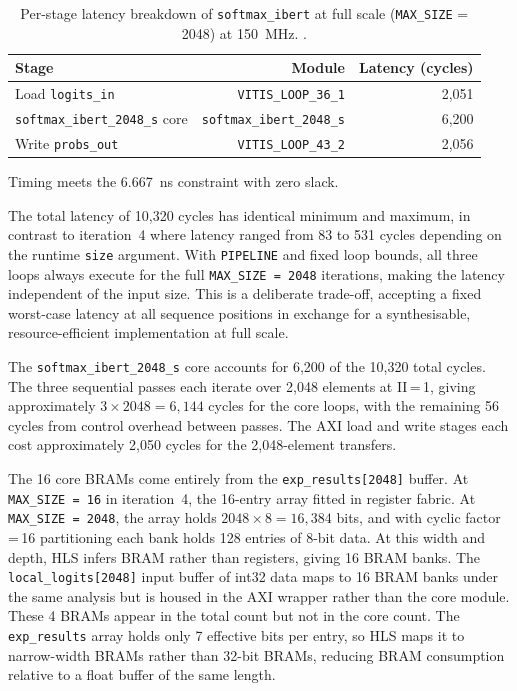 \begin{table}[H]
  \centering
  \begin{tabular}{lrr}
    \toprule
    Stage & Module & Latency (cycles) \\
    \midrule
    Load \texttt{logits\_in}                & \texttt{VITIS\_LOOP\_36\_1}      & 2{,}051 \\
    \texttt{softmax\_ibert\_2048\_s} core   & \texttt{softmax\_ibert\_2048\_s} & 6{,}200 \\
    Write \texttt{probs\_out}               & \texttt{VITIS\_LOOP\_43\_2}      & 2{,}056 \\
    \bottomrule
  \end{tabular}
  \caption{Per-stage latency breakdown of \texttt{softmax\_ibert} at full
           scale (\texttt{MAX\_SIZE} = 2048) at \SI{150}{\mega\hertz}.
.}
  \label{tab:softmax_ibert_u3_latency}
\end{table}

Timing meets the \SI{6.667}{\nano\second} constraint with zero slack.

The total latency of 10{,}320 cycles has identical minimum and maximum,
in contrast to iteration~4 where latency ranged from 83 to 531 cycles
depending on the runtime \texttt{size} argument. With \texttt{PIPELINE}
and fixed loop bounds, all three loops always execute for the full
\texttt{MAX\_SIZE\,=\,2048} iterations, making the latency independent of
the input size. This is a deliberate trade-off, accepting a fixed
worst-case latency at all sequence positions in exchange for a
synthesisable, resource-efficient implementation at full scale.

The \texttt{softmax\_ibert\_2048\_s} core accounts for 6{,}200 of the
10{,}320 total cycles. The three sequential passes each iterate over
2{,}048 elements at II\,=\,1, giving approximately $3 \times 2048 = 6{,}144$
cycles for the core loops, with the remaining 56 cycles from control
overhead between passes. The AXI load and write stages each cost
approximately 2{,}050 cycles for the 2{,}048-element transfers.

The 16 core BRAMs come entirely from the \texttt{exp\_results[2048]}
buffer. At \texttt{MAX\_SIZE\,=\,16} in iteration~4, the 16-entry array
fitted in register fabric. At \texttt{MAX\_SIZE\,=\,2048}, the array
holds $2048 \times 8 = 16{,}384$ bits, and with cyclic factor\,=\,16
partitioning each bank holds 128 entries of 8-bit data. At this width
and depth, HLS infers BRAM rather than registers, giving 16 BRAM banks.
The \texttt{local\_logits[2048]} input buffer of int32 data maps to 16
BRAM banks under the same analysis but is housed in the AXI wrapper
rather than the core module. These 4 BRAMs appear in the total count
but not in the core count. The \texttt{exp\_results} array holds only
7 effective bits per entry, so HLS maps it to narrow-width BRAMs rather
than 32-bit BRAMs, reducing BRAM consumption relative to a float buffer
of the same length.


